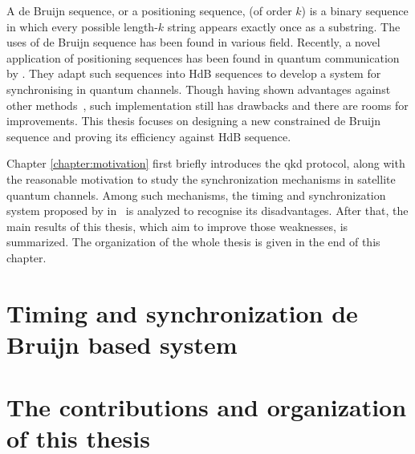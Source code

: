 A de Bruijn sequence, or a positioning sequence, (of order $k$) is a binary sequence in which every possible length-$k$ string appears exactly once as a substring. The uses of de Bruijn sequence has been found in various field. Recently, a novel application of positioning sequences has been found in quantum communication by \citeauthor{zhang2021timing}. They adapt such sequences into \gls{HdB} sequences to develop a system for synchronising in quantum channels. Though having shown advantages against other methods~\cite{zhang2021timing}, such implementation still has drawbacks and there are rooms for improvements. This thesis focuses on designing a new constrained de Bruijn sequence and proving its efficiency against \gls{HdB} sequence. 

Chapter \ref{chapter:motivation} first briefly introduces the \gls{qkd} protocol, along with the reasonable motivation to study the synchronization mechanisms in satellite quantum channels. Among such mechanisms, the timing and synchronization system proposed by \citeauthor{zhang2021timing} in~\cite{zhang2021timing} is analyzed to recognise its disadvantages. After that, the main results of this thesis, which aim to improve those weaknesses, is summarized. The organization of the whole thesis is given in the end of this chapter. 


\section{Timing and synchronization de Bruijn based system}


\section{The contributions and organization of this thesis}




